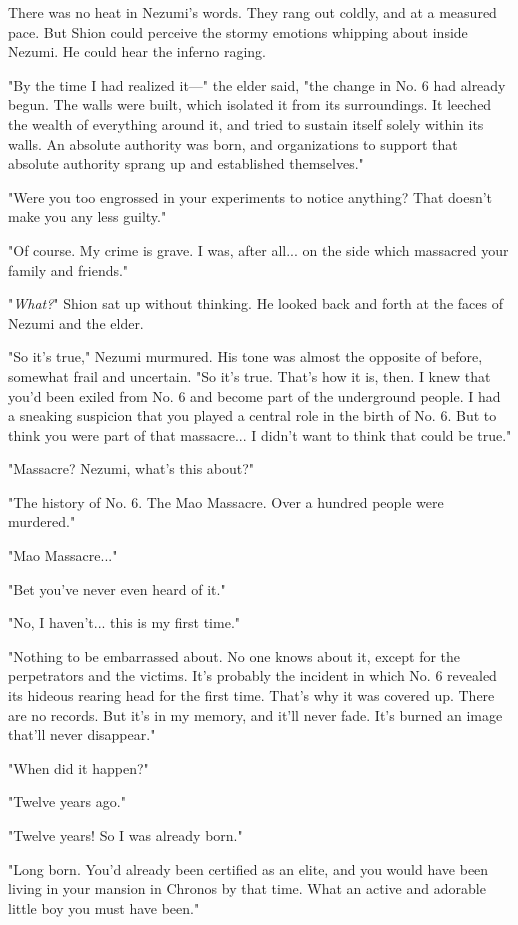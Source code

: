 There was no heat in Nezumi's words. They rang out coldly, and at a
measured pace. But Shion could perceive the stormy emotions whipping
about inside Nezumi. He could hear the inferno raging.

"By the time I had realized it---" the elder said, "the change in No. 6
had already begun. The walls were built, which isolated it from its
surroundings. It leeched the wealth of everything around it, and tried
to sustain itself solely within its walls. An absolute authority was
born, and organizations to support that absolute authority sprang up and
established themselves."

"Were you too engrossed in your experiments to notice anything? That
doesn't make you any less guilty."

"Of course. My crime is grave. I was, after all... on the side which
massacred your family and friends."

"\emph{What?}" Shion sat up without thinking. He looked back and forth at the
faces of Nezumi and the elder.

"So it's true," Nezumi murmured. His tone was almost the opposite of
before, somewhat frail and uncertain. "So it's true. That's how it is,
then. I knew that you'd been exiled from No. 6 and become part of the
underground people. I had a sneaking suspicion that you played a central
role in the birth of No. 6. But to think you were part of that
massacre... I didn't want to think that could be true."

"Massacre? Nezumi, what's this about?"

"The history of No. 6. The Mao Massacre. Over a hundred people were
murdered."

"Mao Massacre..."

"Bet you've never even heard of it."

"No, I haven't... this is my first time."

"Nothing to be embarrassed about. No one knows about it, except for the
perpetrators and the victims. It's probably the incident in which No. 6
revealed its hideous rearing head for the first time. That's why it was
covered up. There are no records. But it's in my memory, and it'll never
fade. It's burned an image that'll never disappear."

"When did it happen?"

"Twelve years ago."

"Twelve years! So I was already born."

"Long born. You'd already been certified as an elite, and you would have
been living in your mansion in Chronos by that time. What an active and
adorable little boy you must have been."

